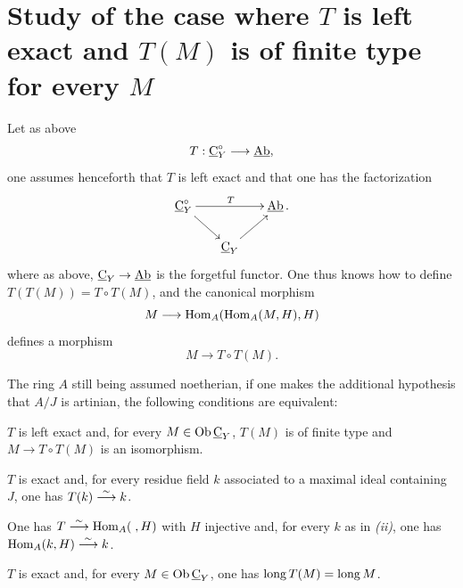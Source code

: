 \section[Study of the case where $T$ is left exact]
{Study of the case where $T$ is left exact and $T(M)$ is of finite type for every $M$} \label{IV.3}

Let as above
\begin{equation*} T:\ccat_{Y}^{\circ}\to \Ab,
\end{equation*}
one assumes henceforth that $T$ is left exact and that one has the factorization
$$
\xymatrix@C=6mm@R=6mm{
\ccat^{\circ}_{Y}\ar[dr]\ar^{T}[rr]&&\Ab\,.\\
&\ccat_{Y}\ar[ur]&}
$$
where as above, $\ccat_Y\to\Ab$ is the forgetful functor. One thus knows how to define $T(T(M))=T\circ T(M)$, and the canonical morphism
$$
M\to \Hom_{A}(\Hom_{A}(M, H), H)
$$
defines a morphism
$$
M\to T\circ T(M).
$$

\begin{proposition} \label{IV.3.1}
The ring $A$ still being assumed noetherian, if one makes the additional hypothesis that $A/J$ is artinian, the following conditions are equivalent:
\begin{enumeratei}
\item
$T$ is left exact and, for every $M\in \operatorname{Ob} \underline{\mathrm{C}}_{Y}$, $T(M)$ is of finite type and \hbox{$M\to T\circ T(M)$} is an isomorphism.

\item
$T$ is exact and, for every residue field $k$ associated to a maximal ideal containing~$J$, one has $T(k)\overset{\sim}{\longrightarrow} k$.

\item
One has $T\overset{\sim}{\longrightarrow} \operatorname{Hom}_{A}(\;, H)$ with $H$ injective and, for every $k$ as in \emph{(ii)}, one has $\operatorname{Hom}_{A}(k, H)\overset{\sim}{\longrightarrow} k$.

\item
$T$ is exact and, for every $M\in \operatorname{Ob} \underline{\mathrm{C}}_{Y}$, one has $\operatorname{long} T(M)=\operatorname{long} M$.
\end{enumeratei}
\end{proposition}

